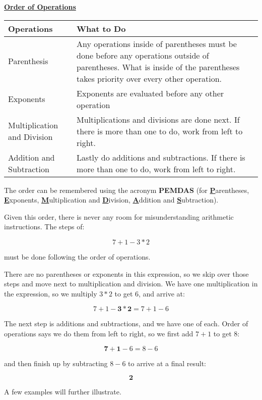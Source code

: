 \begin{definition}
	\textbf{\underline{Order of Operations}} \hfill \\
	\bigskip
	\begin{tabular}{ | l | p{8 cm} |}
		\hline
		Operations & What to Do \\ \hline
		Parenthesis & Any operations inside of parentheses must be done before any operations outside of parentheses.  What is inside of the parentheses takes priority over every other operation.\\ \hline
		Exponents & Exponents are evaluated before any other operation \\ \hline
		Multiplication and Division & Multiplications and divisions are done next. If there is more than one to do, work from left to right.\\ \hline
		Addition and Subtraction & Lastly do additions and subtractions. If there is more than one to do, work from left to right. \\ \hline
	\end{tabular}
\end{definition}

The order can be remembered using the acronym \textbf{PEMDAS} (for \textbf{\underline{P}}arentheses, \textbf{\underline{E}}xponents, \textbf{\underline{M}}ultiplication and \textbf{\underline{D}}ivision, \textbf{\underline{A}}ddition and \textbf{\underline{S}}ubtraction).

Given this order, there is never any room for misunderstanding arithmetic instructions. The steps of:

$$7+1-3*2$$

must be done following the order of operations.

There are no parentheses or exponents in this expression, so we skip over those steps and move next to multiplication and division. We have one multiplication in the expression, so we multiply $3*2$ to get $6$, and arrive at:

$$7+1-\bm{3*2} = 7+1-6$$

The next step is additions and subtractions, and we have one of each. Order of operations says we do them from left to right, so we first add $7+1$ to get $8$:

$$\bm{7+1}-6 = 8-6$$

and then finish up by subtracting $8-6$ to arrive at a final result:

$$\bm{2}$$

A few examples will further illustrate.

